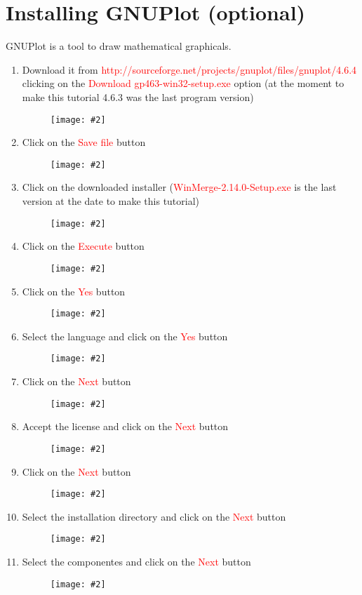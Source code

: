 \documentclass[a4paper]{article}
\newcommand{\FIG}[2]
{
	\begin{figure}[ht!]
	\centering
	\texttt{[image: \#2]}
	\end{figure}
}
\newcommand{\FIGUREB}[1]{\FIG{0.26}{#1}}
\newcommand{\RED}[1] {\textcolor{red}{#1}}
\begin{document}
\clearpage

\section{Installing GNUPlot (optional)}

GNUPlot is a tool to draw mathematical graphicals.

\begin{enumerate}

\item Download it from
\RED{http://sourceforge.net/projects/gnuplot/files/gnuplot/4.6.4} clicking on
the \RED{Download gp463-win32-setup.exe} option (at the moment to make this
tutorial 4.6.3 was the last program version)
\FIGUREB{GNUPlot-1.png.eps}

\clearpage

\item Click on the \RED{Save file} button
\FIGUREB{GNUPlot-2.png.eps}

\item Click on the downloaded installer (\RED{WinMerge-2.14.0-Setup.exe} is the
last version at the date to make this tutorial)
\FIGUREB{GNUPlot-3.png.eps}

\clearpage

\item Click on the \RED{Execute} button
\FIGUREB{GNUPlot-4.png.eps}

\item Click on the \RED{Yes} button
\FIGUREB{GNUPlot-5.png.eps}

\clearpage

\item Select the language and click on the \RED{Yes} button
\FIGUREB{GNUPlot-6.png.eps}

\item Click on the \RED{Next} button
\FIGUREB{GNUPlot-7.png.eps}

\clearpage

\item Accept the license and click on the \RED{Next} button
\FIGUREB{GNUPlot-8.png.eps}

\item Click on the \RED{Next} button
\FIGUREB{GNUPlot-9.png.eps}

\clearpage

\item Select the installation directory and click on the \RED{Next} button
\FIGUREB{GNUPlot-10.png.eps}

\item Select the componentes and click on the \RED{Next} button
\FIGUREB{GNUPlot-11.png.eps}


\end{enumerate}
\end{document}
